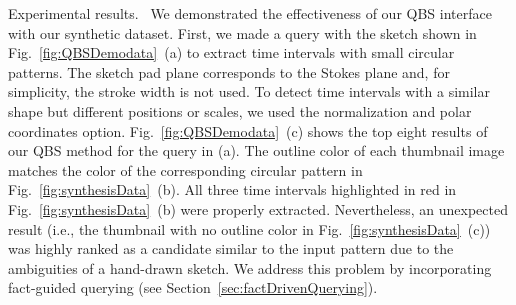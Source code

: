 %
\textsf{Experimental results.\ } We demonstrated the effectiveness of our QBS interface with our synthetic dataset.
First, we made a query with the sketch shown in Fig.~\ref{fig:QBSDemodata}~(a) to extract time intervals with small circular patterns. 
The sketch pad plane corresponds to the Stokes plane and, for simplicity, the stroke width is not used.
To detect time intervals with a similar shape but different positions or scales, we used the normalization and polar coordinates option.
Fig.~\ref{fig:QBSDemodata}~(c) shows the top eight results of our QBS method for the query in (a).
The outline color of each thumbnail image matches the color of the corresponding circular pattern in Fig.~\ref{fig:synthesisData}~(b).
All three time intervals highlighted in red in Fig.~\ref{fig:synthesisData}~(b) were properly extracted.
Nevertheless, an unexpected result (i.e., the thumbnail with no outline color in Fig.~\ref{fig:synthesisData}~(c)) was highly ranked as a candidate similar to the input pattern due to the ambiguities of a hand-drawn sketch.
We address this problem by incorporating fact-guided querying (see Section~\ref{sec:factDrivenQuerying}). 

%
